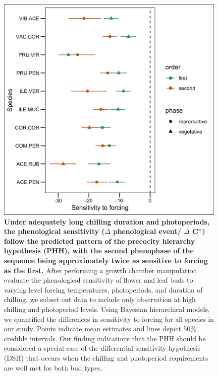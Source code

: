 \documentclass[11pt]{article}\usepackage[]{graphicx}\usepackage[]{color}
\begin{document}
{\begin{figure}[h!]
    \centering
         \includegraphics[width=.8\textwidth]{..//Plots/Flobuds_manuscript_figs/phh_plot.png}
    \caption{\textbf{Under adequately long chilling duration and photoperiods, the phenological sensitivity ($\Delta$ phenological event/ $\Delta$ C$\degree$) follow the predicted pattern of the precocity hierarchy hypothesis (PHH), with the second phenophase of the sequence being approximately twice as sensitive to forcing as the first.} After performing a growth chamber manipulation evaluate the phenological sensitivity of flower and leaf buds to varying level forcing temperatures, photoperiods, and duration of chilling, we subset out data to include only observation at high chilling and photoperiod levels. Using Bayesian hierarchical models, we quantified the differences in sensitivity to forcing for all species in our study. Points indicate mean estimates and lines depict 50\% credible intervals. Our finding indications that the PHH should be considered a special case of the differential sensitivity hypothesis (DSH) that occurs when the chilling and photoperiod requirements are well met for both bud types.}
    \label{fig:phh}
\end{figure}

}
\end{document}
